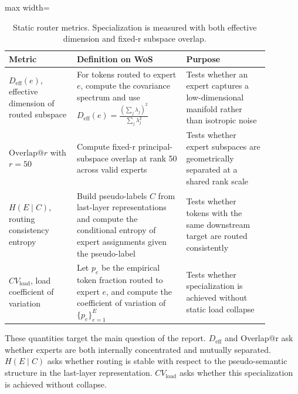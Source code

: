 \documentclass[11pt]{article}
\newcommand{\tablesize}{\footnotesize}
\begin{document}
\begin{table}[H]
\centering
\tablesize
\begin{adjustbox}{max width=\linewidth}
\begin{tabular}{p{0.23\linewidth}p{0.37\linewidth}p{0.28\linewidth}}
\toprule
Metric & Definition on WoS & Purpose \\
\midrule
$D_{\mathrm{eff}}(e)$, effective dimension of routed subspace & For tokens routed to expert $e$, compute the covariance spectrum and use $D_{\mathrm{eff}}(e)=\frac{(\sum_j \lambda_j)^2}{\sum_j \lambda_j^2}$ & Tests whether an expert captures a low-dimensional manifold rather than isotropic noise \\
$\mathrm{Overlap@}r$ with $r=50$ & Compute fixed-r principal-subspace overlap at rank 50 across valid experts & Tests whether expert subspaces are geometrically separated at a shared rank scale \\
$H(E \mid C)$, routing consistency entropy & Build pseudo-labels $C$ from last-layer representations and compute the conditional entropy of expert assignments given the pseudo-label & Tests whether tokens with the same downstream target are routed consistently \\
$CV_{\mathrm{load}}$, load coefficient of variation & Let $p_e$ be the empirical token fraction routed to expert $e$, and compute the coefficient of variation of $\{p_e\}_{e=1}^E$ & Tests whether specialization is achieved without static load collapse \\
\bottomrule
\end{tabular}
\end{adjustbox}
\caption{Static router metrics. Specialization is measured with both effective dimension and fixed-r subspace overlap.}
\label{tab:router-metrics}
\end{table}

These quantities target the main question of the report. $D_{\mathrm{eff}}$ and Overlap@r ask whether experts are both internally concentrated and mutually separated. $H(E \mid C)$ asks whether routing is stable with respect to the pseudo-semantic structure in the last-layer representation. $CV_{\mathrm{load}}$ asks whether this specialization is achieved without collapse.
\end{document}
